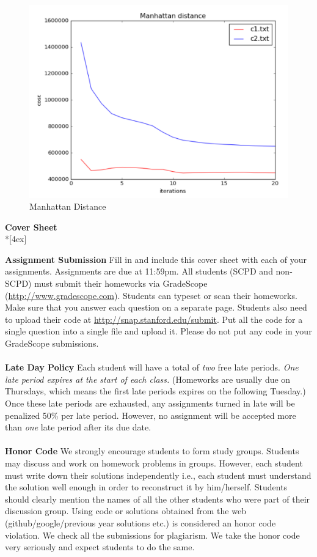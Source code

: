 \documentclass[11pt]{article}
\begin{document}
\begin{figure}[h]
\center
\includegraphics[scale=0.7]{Manhattan.png}
\caption{Manhattan Distance}
\end{figure}

\pagebreak[4]
\begin{center}
\LARGE{\bf \textsf{Cover Sheet}} \\*[4ex]
\end{center}

\textbf{Assignment Submission } Fill in and include this cover sheet with each of your assignments. Assignments are due at 11:59pm. All students (SCPD and non-SCPD) must submit their homeworks via GradeScope (\url{http://www.gradescope.com}). Students can typeset or scan their homeworks. Make sure that you answer each question on a separate page. Students also need to upload their code at \url{http://snap.stanford.edu/submit}. Put all the code for a single question into a single file and upload it. Please do not put any code in your GradeScope submissions.
\\
\\
\textbf{Late Day Policy } Each student will have a total of {\em two} free late periods. {\em One late period expires at the start of each class.} (Homeworks are usually due on Thursdays, which means the first late periods expires on the following Tuesday.) Once these late periods are exhausted, any assignments turned in late will be penalized 50\% per late period. However, no assignment will be accepted more than {\em one} late period after its due date.
\\
\\
\textbf{Honor Code } We strongly encourage students to form study groups. Students may discuss and work on homework problems in groups. However, each student must write down their solutions independently i.e., each student must understand the solution well enough in order to reconstruct it by him/herself.  Students should clearly mention the names of all the other students who were part of their discussion group. Using code or solutions obtained from the web (github/google/previous year solutions etc.) is considered an honor code violation. We check all the submissions for plagiarism. We take the honor code very seriously and expect students to do the same.
\end{document}
